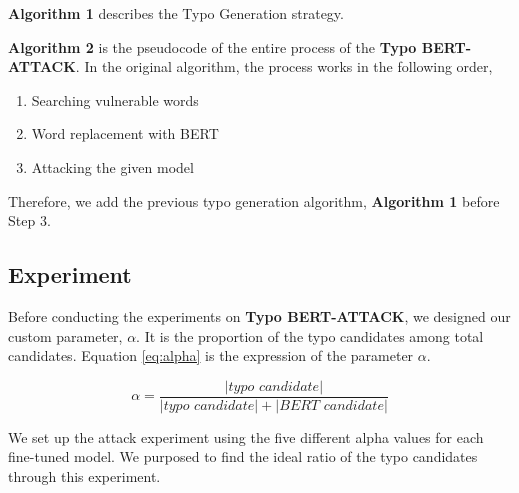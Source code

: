 \documentclass[11pt,a4paper]{article}
\begin{document}
\textbf{Algorithm 1} describes the Typo Generation strategy.



\textbf{Algorithm 2} is the pseudocode of the entire process of the \textbf{Typo BERT-ATTACK}.
In the original algorithm, the process works in the following order,
\begin{enumerate}
    \item Searching vulnerable words
    \item Word replacement with BERT
    \item Attacking the given model
\end{enumerate}

Therefore, we add the previous typo generation algorithm, \textbf{Algorithm 1} before Step 3.

\subsection{Experiment}

Before conducting the experiments on \textbf{Typo BERT-ATTACK}, we designed our custom parameter, $\alpha$. 
It is the proportion of the typo candidates among total candidates.
Equation \ref{eq:alpha} is the expression of the parameter $\alpha$.

\begin{equation}
\label{eq:alpha}
    \alpha = \frac{|\textit{typo candidate}|}{|\textit{typo candidate}| + |\textit{BERT candidate}|}
\end{equation}

We set up the attack experiment using the five different alpha values for each fine-tuned model. We purposed to find the ideal ratio of the typo candidates through this experiment. 
\end{document}
